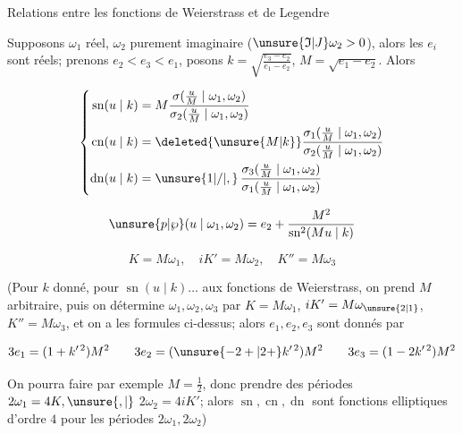 \begin{center}Relations entre les fonctions de Weierstrass et de Legendre\end{center}

Supposons $\omega_1$ réel, $\omega_2$ purement imaginaire ($\unsure{\mathfrak I|J}\omega_2>0$), alors les $e_i$ sont réels; prenons $e_2<e_3<e_1$, posons $k=\sqrt{\frac{e_3-e_2}{e_1-e_2}}$, $M=\sqrt{e_1-e_2}$. Alors

\[
\left\{\begin{aligned}
\operatorname{sn}(u\mid k)&=M\frac{\sigma(\frac uM\mid\omega_1,\omega_2)}{\sigma_2(\frac uM\mid\omega_1,\omega_2)}\\
\operatorname{cn}(u\mid k)&=\deleted{\unsure{M|k}}\frac{\sigma_1(\frac uM\mid\omega_1,\omega_2)}{\sigma_2(\frac uM\mid\omega_1,\omega_2)}\\
\operatorname{dn}(u\mid k)&=\unsure{1|/|,}\,\frac{\sigma_3(\frac uM\mid\omega_1,\omega_2)}{\sigma_1(\frac uM\mid\omega_1,\omega_2)}
\end{aligned}\right.
\]

\[
\unsure{p|\wp}(u\mid\omega_1,\omega_2)=e_2+\frac{M^2}{\operatorname{sn}^2(Mu\mid k)}
\]

\[
K=M\omega_1,\quad iK'=M\omega_2,\quad K''=M\omega_3
\]

(Pour $k$ donné, pour  $\operatorname{sn}(u\mid k)\ldots$ aux fonctions de Weierstrass, on prend $M$ arbitraire, puis on détermine $\omega_1,\omega_2,\omega_3$ par $K=M\omega_1$, $iK'=M\omega_{\unsure{2|1}}$, $K''=M\omega_3$, et on a les formules ci-dessus;  alors $e_1,e_2,e_3$ sont donnés par

\[
3e_1=(1+k'^{\,2})M^2\qquad
3e_2=(\unsure{-2+|2+}k'^{\,2})M^2\qquad
3e_3=(1-2k'^{\,2})M^2
\]

On pourra faire par exemple $M=\frac12$, donc prendre des périodes  $2\omega_1=4K,\unsure{,|{}}$ $2\omega_2=4iK'$; alors $\operatorname{sn},\operatorname{cn},\operatorname{dn}$ sont fonctions elliptiques d'ordre $4$ pour les périodes $2\omega_1,2\omega_2$)

